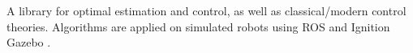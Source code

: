 A library for optimal estimation and control, as well as classical/modern control theories. Algorithms are applied on simulated robots using ROS \cite{quigley2009ros} and Ignition Gazebo \cite{igngazebo}.

